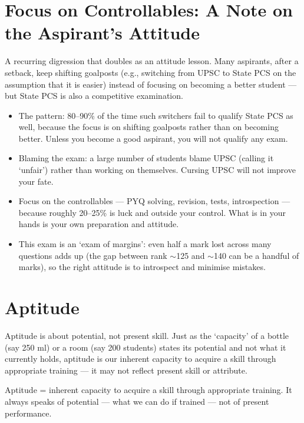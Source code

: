 \section{Focus on Controllables: A Note on the Aspirant's Attitude}

A recurring digression that doubles as an attitude lesson. Many aspirants, after a setback, keep shifting goalposts (e.g., switching from UPSC to State PCS on the assumption that it is easier) instead of focusing on becoming a better student --- but State PCS is also a competitive examination.

\begin{itemize}
\item The pattern: 80--90\% of the time such switchers fail to qualify State PCS as well, because the focus is on shifting goalposts rather than on becoming better. Unless you become a good aspirant, you will not qualify any exam.
\item Blaming the exam: a large number of students blame UPSC (calling it `unfair') rather than working on themselves. Cursing UPSC will not improve your fate.
\end{itemize}

\begin{CriticalPoint}
\begin{itemize}
\item Focus on the controllables --- PYQ solving, revision, tests, introspection --- because roughly 20--25\% is luck and outside your control. What is in your hands is your own preparation and attitude.
\item This exam is an `exam of margins': even half a mark lost across many questions adds up (the gap between rank $\sim$125 and $\sim$140 can be a handful of marks), so the right attitude is to introspect and minimise mistakes.
\end{itemize}
\end{CriticalPoint}

\section{Aptitude}

Aptitude is about potential, not present skill. Just as the `capacity' of a bottle (say 250 ml) or a room (say 200 students) states its potential and not what it currently holds, aptitude is our inherent capacity to acquire a skill through appropriate training --- it may not reflect present skill or attribute.

\begin{KeyConcept}
Aptitude = inherent capacity to acquire a skill through appropriate training. It always speaks of potential --- what we can do if trained --- not of present performance.
\end{KeyConcept}

